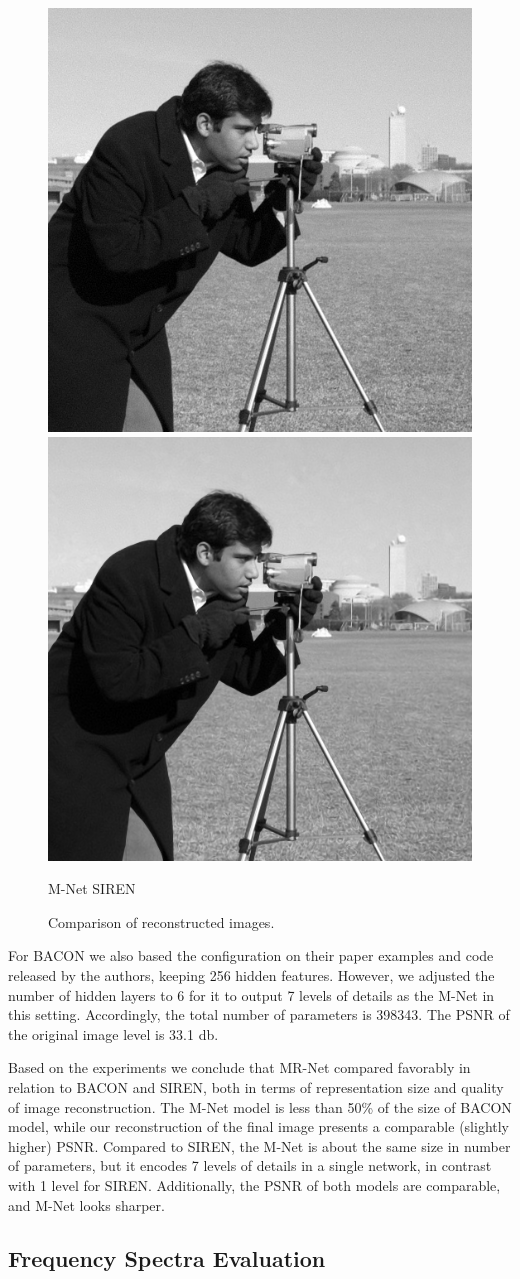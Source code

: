 \begin{figure}[!h]
\centering
\includegraphics[width=0.44\linewidth]{img/ch5/rec-MR-Net.png}
\includegraphics[width=0.44\linewidth]{img/ch5/rec-SIREN.png} \\
\centerline{M-Net \hfil SIREN}
\caption{Comparison of reconstructed images.}
\label{f:siren}
\end{figure}


For BACON we also based the configuration on their paper examples and code released by the authors, keeping 256 hidden features. However, we adjusted the number of hidden layers to 6 for it to output 7 levels of details as the M-Net in this setting. Accordingly, the total number of parameters is 398343. The PSNR of the original image level is 33.1 db.

Based on the experiments we conclude that MR-Net compared favorably in relation to BACON and SIREN, both in terms of representation size and quality of image reconstruction. The M-Net model is less than 50\% of the size of BACON model, while our reconstruction of the final image presents a comparable (slightly higher) PSNR. Compared to SIREN, the M-Net is about the same size in number of parameters, but it encodes 7 levels of details in a single network, in contrast with 1 level for SIREN. Additionally, the PSNR of both models are comparable, and M-Net looks sharper.

\subsection{Frequency Spectra Evaluation}
\label{sub:spectra-eval}

